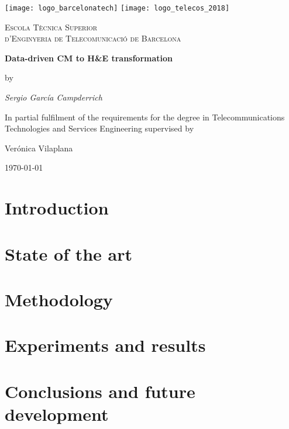 \documentclass[a4paper,12pt,titlepage]{article}
\begin{document}
\begin{titlepage}
  \centering
   \texttt{[image: logo\_barcelonatech]}\hspace{0.5cm}
   \texttt{[image: logo\_telecos\_2018]}\par\vspace{1cm}
  {\scshape\LARGE Escola Tècnica Superior \\ d'Enginyeria de Telecomunicació de Barcelona \par}
  \vspace{3mm}
  {\huge\bfseries Data-driven CM to H\&E transformation\par}
  \vspace{2cm}
  by\par
  {\Large\itshape Sergio García Campderrich\par}
  In partial fulfilment of the requirements for the degree in Telecommunications Technologies and Services Engineering
  \vfill
  supervised by\par
  Verónica Vilaplana

  \vfill

  {\large \today\par}
\end{titlepage}

\clearpage
\thispagestyle{empty}
\null\newpage
{}

\section{Introduction}


\section{State of the art}


\section{Methodology}


\section{Experiments and results}


\section{Conclusions and future development}


\printbibheading
\printbibliography
\end{document}
